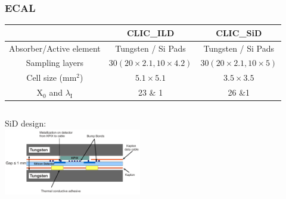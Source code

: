 \documentclass{beamer}
\begin{document}
\begin{frame}
\frametitle{ECAL}
\begin{tabular}{ccc}
    & CLIC\_ILD & CLIC\_SiD\\
\midrule
Absorber/Active element & Tungsten / Si Pads & Tungsten / Si Pads\\
\midrule
Sampling layers & $30(20\times2.1, 10\times4.2)$ & 
$30(20\times2.1, 10\times5)$\\
\midrule
Cell size ($\textrm{mm}^2$) &$5.1\times 5.1$& $3.5\times 3.5$\\
\midrule
$\textrm{X}_0$ and $\lambda_{\textrm{I}}$ & 23 \& 1 & 26 \&1\\
\bottomrule 
\end{tabular}
\begin{columns}[c]
\column{6cm}
\column{6cm}
SiD design:\\
\includegraphics[width=6cm]{sid-ecal-drawing.pdf}
\end{columns}
\end{frame}
\end{document}
